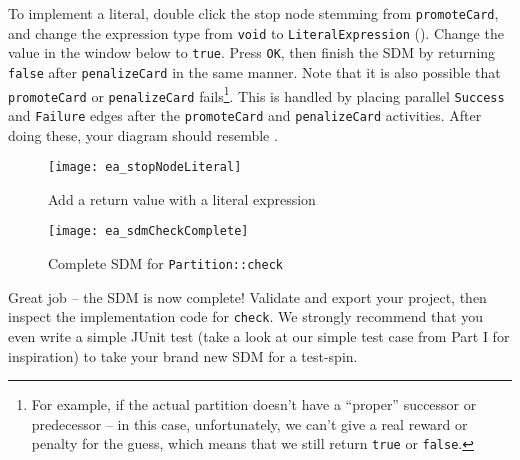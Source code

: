 \begin{stepbystep}
\item To implement a literal, double click the stop node stemming from  \texttt{promoteCard}, and change the expression type from
\texttt{void} to \texttt{LiteralEx\-pression} (). Change the value in the window below to \texttt{true}. Press \texttt{OK},
then finish the SDM by returning \texttt{false} after \texttt{penalizeCard} in the same manner. Note that it is also possible that \texttt{promoteCard} or 
\texttt{penalizeCard} fails\footnote{For example, if the actual partition doesn't have a ``proper'' successor or predecessor -- in this case, unfortunately, we can't 
give a real reward or penalty for the guess, which means that we still return \texttt{true} or \texttt{false}.}. This is handled by placing parallel \texttt{Success} 
and \texttt{Failure} edges after the \texttt{promoteCard} and \texttt{penalizeCard} activities. After doing these, your diagram should 
resemble .

\begin{figure}[htbp]
\begin{center}
  \texttt{[image: ea\_stopNodeLiteral]}
  \caption{Add a return value with a literal expression}
  \label{ea:sdm_check_literal_exp}
\end{center}
\end{figure}

\begin{figure}[htbp]
\begin{center}
  \texttt{[image: ea\_sdmCheckComplete]}
  \caption{Complete SDM for \texttt{Partition::check}}
  \label{ea:sdm_check_finish}
\end{center}
\end{figure}

\item Great job -- the SDM is now complete! Validate and export your project, then inspect the implementation code for \texttt{check}. We
strongly recommend that you even write a simple JUnit test (take a look at our simple test case from Part I for inspiration) to take your brand new SDM for a
test-spin.

\end{stepbystep}
